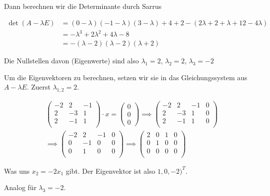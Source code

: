 \documentclass[ngerman,a4paper]{scrartcl}
\begin{document}
Dann berechnen wir die Determinante durch Sarrus

\begin{align*}
  \det(A-\lambda E) &= (0-\lambda)(-1-\lambda)(3-\lambda) + 4 + 2 - (2\lambda + 2 + \lambda + 12 - 4\lambda)\\
  &= -\lambda^3 + 2\lambda^2 + 4\lambda - 8\\
  &= -(\lambda - 2)(\lambda - 2)(\lambda+2)
\end{align*}

Die Nullstellen davon (Eigenwerte) sind also $\lambda_1 = 2$, $\lambda_2 =
2$, $\lambda_3 = -2$

Um die Eigenvektoren zu berechnen, setzen wir sie in das
Gleichungssystem aus $A-\lambda E$. Zuerst $\lambda_{1,2} = 2$.

\begin{align*}
  &\begin{pmatrix}
    -2 & 2 & -1\\
    2 & -3 & 1\\
    2 & -1 & 1\\
  \end{pmatrix} \cdot x =
  \begin{pmatrix}
    0\\0\\0
  \end{pmatrix} \implies   \begin{pmatrix}
    -2 & 2 & -1 & 0\\
    2 & -3 & 1 & 0\\
    2 & -1 & 1 & 0\\
  \end{pmatrix}\\
  &\implies \begin{pmatrix}
    -2 & 2 & -1 & 0\\
    0 & -1 & 0 & 0\\
    0 & 1 & 0 & 0\\
  \end{pmatrix}
  \implies \begin{pmatrix}
    2 & 0 & 1 & 0\\
    0 & 1 & 0 & 0\\
    0 & 0 & 0 & 0\\
  \end{pmatrix}
\end{align*}

Was uns $x_2 = -2x_1$ gibt. Der Eigenvektor ist also $1, 0, -2)^T$.

Analog für $\lambda_3 = -2$.
\end{document}
